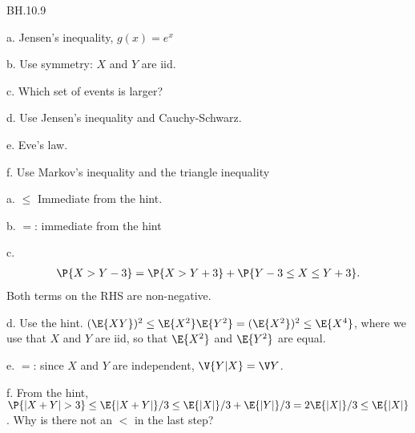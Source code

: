 
\setcounter{theorem}{8}
\begin{exercise}BH.10.9
\begin{hint}
a. Jensen's inequality, $g(x)=e^x$

b. Use symmetry: $X$ and $Y$ are iid.

c. Which set of events is larger?

d.
Use Jensen's inequality and Cauchy-Schwarz.

e. Eve's law.

f. Use Markov's inequality and  the triangle inequality
\end{hint}
\begin{solution}
a. $\leq$ Immediate from the hint.

b. $=$: immediate from the hint

c.
\begin{align*}
\P{X>Y-3} =  \P{X>Y+3} + \P{Y-3\leq X \leq Y+3}.
\end{align*}
Both terms on the RHS are non-negative.

d. Use the hint. $(\E{XY})^{2} \leq \E{X^2}\E{Y^2} =(\E{X^2})^{2} \leq \E{X^4}$, where we use that  $X$ and $Y$ are iid, so that $\E{X^2}$ and $\E{Y^2}$ are equal.

e. $=$: since $X$ and $Y$ are independent, $\V{Y|X} = \V Y$.

f. From the hint,  $\P{|X+Y|>3} \leq \E{|X+Y|}/3 \leq \E{|X|}/3 + \E{|Y|}/3 = 2\E{|X|}/3 \leq \E{|X|}$. Why is there not an $<$ in the last step?
\end{solution}
\end{exercise}

